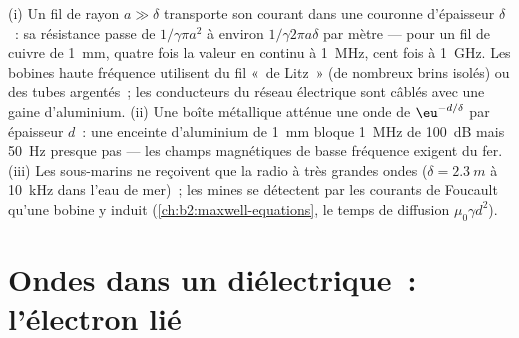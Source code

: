 \begin{example}\label{ex:b2:waves-in-media:skinuses}
(i) Un fil de rayon $a \gg \delta$ transporte son courant dans une couronne
d'épaisseur $\delta$~: sa résistance passe de $1/\gamma\pi a^2$ à environ $1/\gamma
2\pi a\delta$ par mètre --- pour un fil de cuivre de \qty{1}{mm}, quatre fois la valeur
en continu à \qty{1}{MHz}, cent fois à \qty{1}{GHz}. Les bobines haute fréquence
utilisent du fil «~de Litz~» (de nombreux brins isolés) ou des tubes argentés~; les
conducteurs du réseau électrique sont câblés avec une gaine d'aluminium. (ii) Une
boîte métallique atténue une onde de $\eu^{-d/\delta}$ par épaisseur $d$~: une
enceinte d'aluminium de \qty{1}{mm} bloque \qty{1}{MHz} de \qty{100}{dB} mais \qty{50}{Hz}
presque pas --- les champs magnétiques de basse fréquence exigent du fer. (iii)
Les sous-marins ne reçoivent que la radio à très grandes ondes ($\delta = \qty{2.3}{m}$ à
\qty{10}{kHz} dans l'eau de mer)~; les mines se détectent par les courants de Foucault qu'une
bobine y induit (\cref{ch:b2:maxwell-equations}, le temps de
diffusion $\mu_0\gamma d^2$).
\end{example}

\section{Ondes dans un diélectrique~: l'électron lié}


